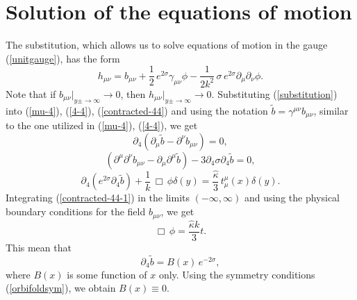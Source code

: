 \documentclass[a4paper,12pt]{article}
\begin{document}
\section{Solution of the equations of motion}
The substitution, which allows us to solve equations of motion in the gauge
(\ref{unitgauge}), has the form
\begin{equation}\label{substitution}
h_{\mu\nu}=b_{\mu\nu}+\frac{1}{2}\,e^{2\sigma}\gamma_{\mu\nu}\phi-
\frac{1}{2k^2}\,\sigma \,
e^{2\sigma}\partial_{\mu}\partial_{\nu}\phi.
\end{equation}
Note that if $b_{\mu\nu}|_{y\pm\to\infty}\to 0$, then
$h_{\mu\nu}|_{y\pm\to\infty}\to 0$. Substituting (\ref{substitution}) into
(\ref{mu-4}), (\ref{4-4}), (\ref{contracted-44})  and using the notation
$\tilde b = \gamma^{\mu\nu}b_{\mu\nu}$, similar to the one utilized in
(\ref{mu-4}), (\ref{4-4}), we get
\begin{equation}\label{mu-4-1}
\partial_4 ( \partial_\mu \tilde b - \partial^\nu  b_{\mu\nu})
= 0,
\end{equation}
\begin{equation}\label{4-4-1}
(\partial^\mu \partial^\nu  b_{\mu\nu} - \partial_\mu
\partial^\mu \tilde b) - 3\partial_4 \sigma \partial_4 \tilde b =0,
\end{equation}
\begin{equation}\label{contracted-44-1}
\partial_4\left(e^{2\sigma}\partial_4 \tilde b \right)+\frac{1}{k}
\,\Box\,\phi \delta(y)  = \frac{\hat \kappa}{3}\,
t_{\mu}^{\mu}(x)\delta(y).
\end{equation}
Integrating (\ref{contracted-44-1}) in the limits $(-\infty,\infty)$ and
using the physical boundary conditions for the field $b_{\mu\nu}$, we get
\begin{equation}\label{phi}
\Box\,\phi = \frac{\hat \kappa k}{3} t.
\end{equation}
This mean that
\begin{equation}
\partial_4 \tilde b =B(x) \, e^{-2\sigma},
\end{equation}
where $B(x)$ is some function of $x$ only. Using the symmetry conditions
(\ref{orbifoldsym}), we obtain $B(x)\equiv 0$.
\end{document}
